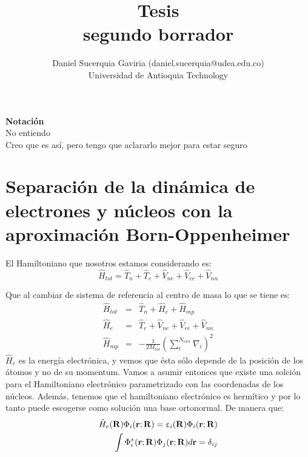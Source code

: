 \documentclass [11pt]{article}
\title{Tesis \\\medskip segundo borrador}
\author{Daniel Sucerquia Gaviria (daniel.sucerquia@udea.edu.co)\\Universidad de Antioquia Technology}
\begin{document}
\maketitle

{\Large \bf Notación}\\

{\color{red} No entiendo}\\
{\color{blue} Creo que es así, pero tengo que aclararlo mejor para estar seguro}\\
\section{Separación de la dinámica de electrones y núcleos con la aproximación Born-Oppenheimer}
El Hamiltoniano que nosotros estamos considerando es:
\begin{equation}
    {\hat H}_{tot}={\hat T}_n+{\hat T}_e+{\hat V}_{ne}+{\hat V}_{ee}+{\hat V}_{nn}
\end{equation}

Que al cambiar de sistema de referencia al centro de masa lo que se tiene es:
\begin{eqnarray}
    {\hat H}_{tot} & =  & {\hat T}_n+{\hat H}_e+{\hat H}_{mp} \\
    {\hat H}_e & = & {\hat T}_e+{\hat V}_{ne}+{\hat V}_{ee}+{\hat V}_{nn}\\
    {\hat H}_{mp} & = & -\frac{1}{2M_{tot}}\left(\sum_i^{N_{elec}}\nabla_i\right)^2
\end{eqnarray}
$\hat H_e $ es la energía electrónica, y vemos que ésta sólo depende de la posición de los átomos y no de su momentum. Vamos a asumir entonces que existe una solción para el Hamiltoniano electrónico parametrizado con las coordenadas de los núcleos. Además, tenemos que el hamiltoniano electrónico es hermítico y por lo tanto puede escogerse como solución una base ortonormal. De manera que:  
\begin{eqnarray}
    {\hat H}_e({\bf R}) \Phi_i({\bf r};{\bf R})=\upvarepsilon_i({\bf R}) \Phi_i({\bf r};{\bf R})\\
    \int \Phi_i^*({\bf r};{\bf R})\Phi_j({\bf r};{\bf R})d{\bf r}=\delta_{ij}
\end{eqnarray}
\end{document}
